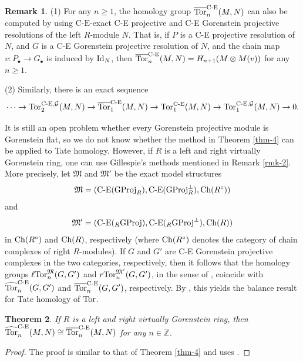\documentclass[reqno,12pt]{amsart}
\numberwithin{equation}{section}
\def\Ch{\mbox{\rm Ch}}
\theoremstyle{plain}
\newtheorem{theorem}{\bf Theorem}[section]
\theoremstyle{definition}
\newtheorem{remark}[theorem]{\bf Remark}
\newcommand{\CE}{\mathrm{C}\text{-}\mathrm{E}}
\begin{document}
\begin{remark}\label{rmk-1}
    {\rm (1)} For any $n\geq 1$, the homology group $\overline{\mbox{\rm Tor}}_n^{\text{C-E}}(M,N)$ can also be computed by using $\CE$-exact C-E projective and C-E Gorenstein projective resolutions of the left $R$-module $N$. That is, if $P$ is a C-E projective resolution of $N$, and $G$ is a C-E Gorenstein projective resolution of $N$, and the chain map $v:P_{\bullet}\to G_{\bullet}$ is induced by $\mbox{\rm Id}_N$, then $\overline{\mbox{\rm Tor}}_n^{\text{C-E}}(M,N)=H_{n+1}(M\otimes M(v))$ for any $n\geq 1$.

    {\rm (2)} Similarly, there is an exact sequence $$\cdots\to \mbox{\rm Tor}^{\text{C-E},\mathcal{G}}_2(M,N)\to \overline{\mbox{\rm Tor}}_1^{\text{C-E}}(M,N) \to \mbox{\rm Tor}_1^{\text{C-E}}(M,N)\to \mbox{\rm Tor}^{\text{C-E},\mathcal{G}}_1(M,N)\to 0.$$
\end{remark}
It is still an open problem whether every Gorenstein projective module is Gorenstein flat, so we do not know whether the method in Theorem \ref{thm-4} can be applied to Tate homology. However, if $R$ is a left and right virtually Gorenstein ring, one can use Gillespie's
methods mentioned in Remark \ref{rmk-2}. More precisely, let $\mathfrak{M}$ and
$\mathfrak{M}'$ be the exact model structures
$$\mathfrak{M}=(\text{C-E}({\rm GProj}_R),\text{C-E}({\rm GProj}_R^{\perp}),
\Ch(R^{\circ}))$$ and
$$\mathfrak{M'}=(\text{C-E}(_R{\rm GProj}),\text{C-E}(_R{\rm GProj}^{\perp}),\Ch(R))$$ in
$\Ch(R^{\circ})$ and $\Ch(R)$,
respectively (where $\Ch(R^{\circ})$ denotes the category of chain complexes of right $R$-modules). If $G$ and $G'$ are C-E Gorenstein projective complexes in the two categories, respectively, then it follows that the homology groups $\ell\mbox{\rm Tor}_n^{\mathfrak{M}}(G,G')$ and $r\mbox{\rm Tor}_n^{\mathfrak{M'}}(G,G')$, in the sense of \cite[Definition 8.2]{G21}, coincide with $\widehat{\mbox{\rm Tor}}_n^{\text{C-E}} (G,G')$ and $\overline{\mbox{\rm Tor}}_n^{\text{C-E}}(G,G')$, respectively. By \cite[Proposition 8.6]{G21}, this yields the balance result for Tate homology of $\mbox{\rm Tor}$.


\begin{theorem}\label{thm-5}
    If $R$ is a left and right virtually Gorenstein ring, then $\widehat{\Tor}_n^{\CE}(M,N)\cong \overline{\Tor}_n^{\CE}(M,N)$ for any $n\in\mathbb{Z}$.
\end{theorem}
\begin{proof}
    The proof is similar to that of Theorem \ref{thm-4} and uses \cite[Proposition 8.6]{G21}.
\end{proof}
\end{document}
